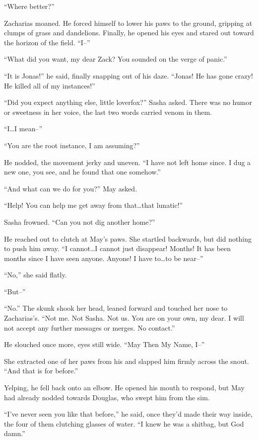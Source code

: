 ``Where better?''

Zacharias moaned. He forced himself to lower his paws to the ground, gripping at clumps of grass and dandelions. Finally, he opened his eyes and stared out toward the horizon of the field. ``I--''

``What did you want, my dear Zack? You sounded on the verge of panic.''

``It is Jonas!'' he said, finally snapping out of his daze. ``Jonas! He has gone crazy! He killed all of my instances!''

``Did you expect anything else, little loverfox?'' Sasha asked. There was no humor or sweetness in her voice, the last two words carried venom in them.

``I\ldots I mean--''

``You are the root instance, I am assuming?''

He nodded, the movement jerky and uneven. ``I have not left home since. I dug a new one, you see, and he found that one somehow.''

``And what can we do for you?'' May asked.

``Help! You can help me get away from that\ldots that lunatic!''

Sasha frowned. ``Can you not dig another home?''

He reached out to clutch at May's paws. She startled backwards, but did nothing to push him away. ``I cannot\ldots I cannot just disappear! Months! It has been months since I have seen anyone. Anyone! I have to\ldots to be near--''

``No,'' she said flatly.

``But--''

``No.'' The skunk shook her head, leaned forward and touched her nose to Zacharias's. ``Not me. Not Sasha. Not us. You are on your own, my dear. I will not accept any further messages or merges. No contact.''

He slouched once more, eyes still wide. ``May Then My Name, I--''

She extracted one of her paws from his and slapped him firmly across the snout. ``And that is for before.''

Yelping, he fell back onto an elbow. He opened his mouth to respond, but May had already nodded towards Douglas, who swept him from the sim.

``I've never seen you like that before,'' he said, once they'd made their way inside, the four of them clutching glasses of water. ``I knew he was a shitbag, but God damn.''

